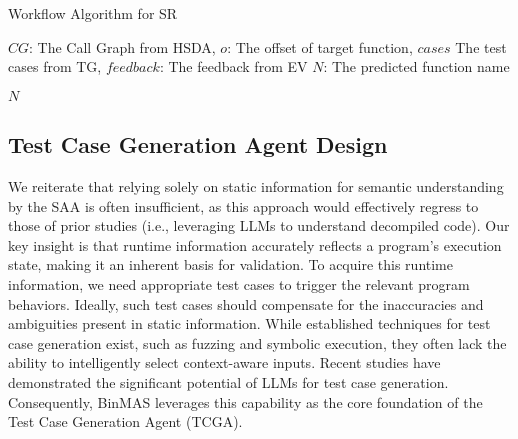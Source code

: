 \documentclass[acmsmall,screen,review,anonymous]{acmart} %
\begin{document}
\begin{algorithm}
  \caption{Workflow Algorithm for SR}
  \label{alg:sr_workflow}
  \begin{algorithmic}[1]
    \REQUIRE $CG$: The Call Graph from HSDA, $o$: The offset of target function, $cases$ The test cases from TG, $feedback$: The feedback from EV
    \ENSURE $N$: The predicted function name


        \ELSE
        \ENDIF
    \ENDWHILE

    \ENDIF

    \RETURN $N$
  \end{algorithmic}
\end{algorithm}





\subsection{Test Case Generation Agent Design}

We reiterate that relying solely on static information for semantic understanding by the SAA is often insufficient, as this approach would effectively regress to those of prior studies (i.e., leveraging LLMs to understand decompiled code). Our key insight is that runtime information accurately reflects a program's execution state, making it an inherent basis for validation. To acquire this runtime information, we need appropriate test cases to trigger the relevant program behaviors. Ideally, such test cases should compensate for the inaccuracies and ambiguities present in static information. While established techniques for test case generation exist, such as fuzzing and symbolic execution, they often lack the ability to intelligently select context-aware inputs. Recent studies have demonstrated the significant potential of LLMs for test case generation. Consequently, BinMAS leverages this capability as the core foundation of the Test Case Generation Agent (TCGA).
\end{document}
